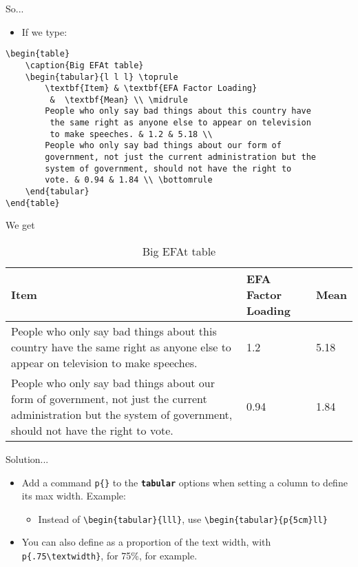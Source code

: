 \documentclass{beamer}
\newcommand{\bftt}[1]{\textbf{\texttt{#1}}}
\newcommand{\cmd}[1]{{\color[HTML]{008000}\bftt{#1}}}
\begin{document}
\begin{frame}[fragile]{So...}
\begin{itemize}
	\item If we type:
\end{itemize}
\begin{verbatim} 
\begin{table}
	\caption{Big EFAt table}
	\begin{tabular}{l l l} \toprule
		\textbf{Item} & \textbf{EFA Factor Loading}
		 &  \textbf{Mean} \\ \midrule
		People who only say bad things about this country have
		 the same right as anyone else to appear on television 
		 to make speeches. & 1.2 & 5.18 \\
		People who only say bad things about our form of 
		government, not just the current administration but the 
		system of government, should not have the right to 
		vote. & 0.94 & 1.84 \\ \bottomrule
	\end{tabular}
\end{table}
\end{verbatim}
\end{frame}

\begin{frame}{We get}
\begin{table}
	\caption{Big EFAt table}
	\begin{tabular}{l l l} \toprule
		\textbf{Item} & \textbf{EFA Factor Loading}
		&  \textbf{Mean} \\ \midrule
		People who only say bad things about this country have
		the same right as anyone else to appear on television 
		to make speeches. & 1.2 & 5.18 \\
		People who only say bad things about our form of 
		government, not just the current administration but the 
		system of government, should not have the right to 
		vote. & 0.94 & 1.84 \\ \bottomrule 
	\end{tabular}
\end{table}
\end{frame} 

\begin{frame}[fragile]{Solution...}
	\begin{itemize}
		\item Add a command \verb|p{}| to the \cmd{tabular} options when setting a column to define its max width. Example:
		\begin{itemize}
			\item Instead of \verb|\begin{tabular}{lll}|, use \verb|\begin{tabular}{p{5cm}ll}|
		\end{itemize}
		\item You can also define as a proportion of the text width, with \verb|p{.75\textwidth}|, for 75\%, for example.
	\end{itemize}
\end{frame}
\end{document}
